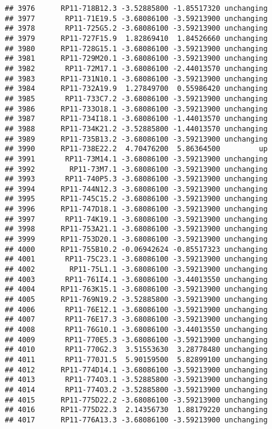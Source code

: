 \documentclass[]{article}
\begin{document}
\begin{verbatim}
## 3976      RP11-718B12.3 -3.52885800 -1.85517320 unchanging
## 3977       RP11-71E19.5 -3.68086100 -3.59213900 unchanging
## 3978       RP11-725G5.2 -3.68086100 -3.59213900 unchanging
## 3979      RP11-727F15.9  1.82869410  1.84526660 unchanging
## 3980      RP11-728G15.1 -3.68086100 -3.59213900 unchanging
## 3981      RP11-729M20.1 -3.68086100 -3.59213900 unchanging
## 3982       RP11-72M17.1 -3.68086100 -2.44013570 unchanging
## 3983      RP11-731N10.1 -3.68086100 -3.59213900 unchanging
## 3984      RP11-732A19.9  1.27849700  0.55986420 unchanging
## 3985       RP11-733C7.2 -3.68086100 -3.59213900 unchanging
## 3986      RP11-733O18.1 -3.68086100 -3.59213900 unchanging
## 3987      RP11-734I18.1 -3.68086100 -1.44013570 unchanging
## 3988      RP11-734K21.2 -3.52885800 -1.44013570 unchanging
## 3989      RP11-735B13.2 -3.68086100 -3.59213900 unchanging
## 3990      RP11-738E22.2  4.70476200  5.86364500         up
## 3991       RP11-73M14.1 -3.68086100 -3.59213900 unchanging
## 3992        RP11-73M7.1 -3.68086100 -3.59213900 unchanging
## 3993       RP11-740P5.3 -3.68086100 -3.59213900 unchanging
## 3994      RP11-744N12.3 -3.68086100 -3.59213900 unchanging
## 3995      RP11-745C15.2 -3.68086100 -3.59213900 unchanging
## 3996      RP11-747D18.1 -3.68086100 -3.59213900 unchanging
## 3997       RP11-74K19.1 -3.68086100 -3.59213900 unchanging
## 3998      RP11-753A21.1 -3.68086100 -3.59213900 unchanging
## 3999      RP11-753D20.1 -3.68086100 -3.59213900 unchanging
## 4000      RP11-755B10.2 -0.06942624 -0.85517323 unchanging
## 4001       RP11-75C23.1 -3.68086100 -3.59213900 unchanging
## 4002        RP11-75L1.1 -3.68086100 -3.59213900 unchanging
## 4003       RP11-761I4.1 -3.68086100 -3.44013550 unchanging
## 4004      RP11-763K15.1 -3.68086100 -3.59213900 unchanging
## 4005      RP11-769N19.2 -3.52885800 -3.59213900 unchanging
## 4006       RP11-76E12.1 -3.68086100 -3.59213900 unchanging
## 4007       RP11-76E17.3 -3.68086100 -3.59213900 unchanging
## 4008       RP11-76G10.1 -3.68086100 -3.44013550 unchanging
## 4009       RP11-770E5.3 -3.68086100 -3.59213900 unchanging
## 4010       RP11-770G2.3  3.51553630  3.28778480 unchanging
## 4011       RP11-770J1.5  5.90159500  5.82899100 unchanging
## 4012      RP11-774D14.1 -3.68086100 -3.59213900 unchanging
## 4013       RP11-774O3.1 -3.52885800 -3.59213900 unchanging
## 4014       RP11-774O3.2 -3.52885800 -3.59213900 unchanging
## 4015      RP11-775D22.2 -3.68086100 -3.59213900 unchanging
## 4016      RP11-775D22.3  2.14356730  1.88179220 unchanging
## 4017      RP11-776A13.3 -3.68086100 -3.59213900 unchanging

\end{verbatim}
\end{document}
